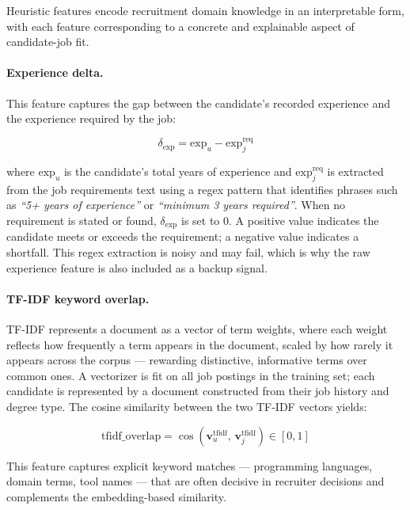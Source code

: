 Heuristic features encode recruitment domain knowledge in an 
interpretable form, with each feature corresponding to a concrete 
and explainable aspect of candidate-job fit.

\paragraph{Experience delta.} This feature captures the gap between the candidate's recorded experience and the experience required by the job:

\begin{equation}
    \delta_{\text{exp}} = \text{exp}_u - \text{exp}_j^{\text{req}}
\end{equation}

where $\text{exp}_u$ is the candidate's total years of experience and $\text{exp}_j^{\text{req}}$ is extracted from the job requirements text using a regex pattern that identifies phrases such as \textit{``5+ years of experience''} or \textit{``minimum 3 years required''}. When no requirement is stated or found, $\delta_{\text{exp}}$ is set to 0. A positive value indicates the candidate meets or exceeds the requirement; a negative value indicates a shortfall. This regex extraction is noisy and may fail, which is why the raw experience feature is also included as a backup signal.

\paragraph{TF-IDF keyword overlap.}
\gls{TF-IDF} represents a document as a vector of term weights, 
where each weight reflects how frequently a term appears in the 
document, scaled by how rarely it appears across the corpus --- 
rewarding distinctive, informative terms over common ones. A vectorizer is fit on all job postings in the training set; 
each candidate is represented by a document constructed from 
their job history and degree type. The cosine similarity between 
the two \gls{TF-IDF} vectors yields:

\begin{equation}
    \text{tfidf\_overlap} = \cos\!\left(\mathbf{v}_u^{\text{tfidf}},\, 
    \mathbf{v}_j^{\text{tfidf}}\right) \in [0, 1]
\end{equation}

This feature captures explicit keyword matches --- programming 
languages, domain terms, tool names --- that are often decisive 
in recruiter decisions and complements the embedding-based 
similarity.

